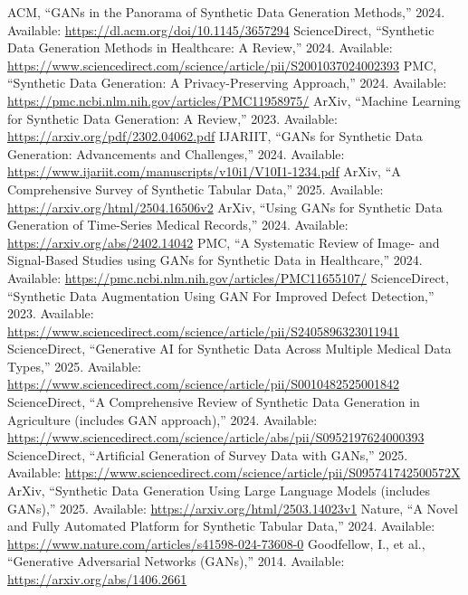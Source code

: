 \documentclass[12pt, draftclsnofoot, onecolumn]{IEEEtran}
\begin{document}
\begin{thebibliography}{99}

 ACM, ``GANs in the Panorama of Synthetic Data Generation Methods,'' 2024. Available: \url{https://dl.acm.org/doi/10.1145/3657294}
 ScienceDirect, ``Synthetic Data Generation Methods in Healthcare: A Review,'' 2024. Available: \url{https://www.sciencedirect.com/science/article/pii/S2001037024002393}
 PMC, ``Synthetic Data Generation: A Privacy-Preserving Approach,'' 2024. Available: \url{https://pmc.ncbi.nlm.nih.gov/articles/PMC11958975/}
 ArXiv, ``Machine Learning for Synthetic Data Generation: A Review,'' 2023. Available: \url{https://arxiv.org/pdf/2302.04062.pdf}
 IJARIIT, ``GANs for Synthetic Data Generation: Advancements and Challenges,'' 2024. Available: \url{https://www.ijariit.com/manuscripts/v10i1/V10I1-1234.pdf}
 ArXiv, ``A Comprehensive Survey of Synthetic Tabular Data,'' 2025. Available: \url{https://arxiv.org/html/2504.16506v2}
 ArXiv, ``Using GANs for Synthetic Data Generation of Time-Series Medical Records,'' 2024. Available: \url{https://arxiv.org/abs/2402.14042}
 PMC, ``A Systematic Review of Image- and Signal-Based Studies using GANs for Synthetic Data in Healthcare,'' 2024. Available: \url{https://pmc.ncbi.nlm.nih.gov/articles/PMC11655107/}
 ScienceDirect, ``Synthetic Data Augmentation Using GAN For Improved Defect Detection,'' 2023. Available: \url{https://www.sciencedirect.com/science/article/pii/S2405896323011941}
 ScienceDirect, ``Generative AI for Synthetic Data Across Multiple Medical Data Types,'' 2025. Available: \url{https://www.sciencedirect.com/science/article/pii/S0010482525001842}
 ScienceDirect, ``A Comprehensive Review of Synthetic Data Generation in Agriculture (includes GAN approach),'' 2024. Available: \url{https://www.sciencedirect.com/science/article/abs/pii/S0952197624000393}
 ScienceDirect, ``Artificial Generation of Survey Data with GANs,'' 2025. Available: \url{https://www.sciencedirect.com/science/article/pii/S095741742500572X}
 ArXiv, ``Synthetic Data Generation Using Large Language Models (includes GANs),'' 2025. Available: \url{https://arxiv.org/html/2503.14023v1}
 Nature, ``A Novel and Fully Automated Platform for Synthetic Tabular Data,'' 2024. Available: \url{https://www.nature.com/articles/s41598-024-73608-0}
 Goodfellow, I., et al., ``Generative Adversarial Networks (GANs),'' 2014. Available: \url{https://arxiv.org/abs/1406.2661}

\end{thebibliography}
\end{document}
